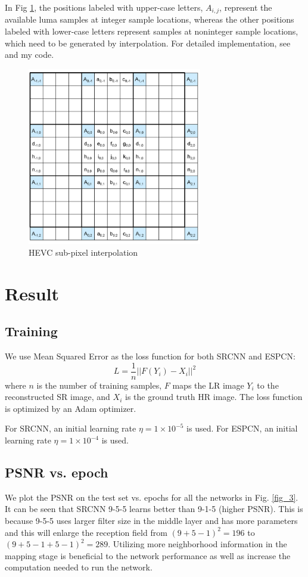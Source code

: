\documentclass[12pt,journal,compsoc]{IEEEtran}
\begin{document}
In Fig \ref{hevc}, the positions labeled with upper-case letters, $A_{i,j}$, represent the available luma samples at integer sample locations, whereas the other positions labeled with lower-case letters represent samples at noninteger sample locations, which need to be generated by interpolation.
For detailed implementation, see \cite{6316136} and my code.
\begin{figure}[!t]
\centering
\includegraphics[width=3in]{hevc.png}
\vspace*{4pt} 
\caption{HEVC sub-pixel interpolation}
\label{hevc}
\end{figure}


\section{Result}
\subsection{Training}
We use Mean Squared Error as the loss function for both SRCNN and ESPCN:
\begin{equation}
	L = \frac{1}{n} || F(Y_i) - X_i ||^2
\end{equation}
where $n$ is the number of training samples, $F$ maps the LR image $Y_i$ to the reconstructed SR image, and $X_i$ is the ground truth HR image.
The loss function is optimized by an Adam optimizer. 

For SRCNN, an initial learning rate $\eta= 1 \times 10^{-5}$ is used.
For ESPCN, an initial learning rate $\eta= 1 \times 10^{-4}$ is used.

\subsection{PSNR vs. epoch}
We plot the PSNR on the test set vs. epochs for all the networks in Fig. \ref{fig_3}. It can be seen that SRCNN 9-5-5 learns better than 9-1-5 (higher PSNR). This is because 9-5-5 uses larger filter size in the middle layer and has more parameters and this will enlarge the reception field from $(9+5-1)^2 = 196$ to $(9+5-1+5-1)^2 = 289$. Utilizing more neighborhood information in the mapping stage is beneficial to the network performance as well as increase the computation needed to run the network.
\end{document}
